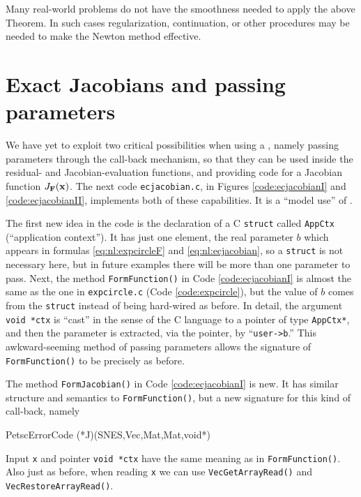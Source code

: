 Many real-world problems do not have the smoothness needed to apply the above Theorem.  In such cases regularization, continuation, or other procedures may be needed to make the Newton method effective.


\section{Exact Jacobians and passing parameters}

We have yet to exploit two critical possibilities when using a \pSNES, namely passing parameters through the call-back mechanism, so that they can be used inside the residual- and Jacobian-evaluation functions, and providing code for a Jacobian function $J_{\mathbf{F}}(\mathbf{x})$.  The next code \texttt{ecjacobian.c}, in Figures \ref{code:ecjacobianI} and \ref{code:ecjacobianII}, implements both of these capabilities.  It is a ``model use'' of \pSNES.

The first new idea in the code is the declaration of a C \texttt{struct} called \texttt{AppCtx} (``application context'').  It has just one element, the real parameter $b$ which appears in formulas \eqref{eq:nl:expcircleF} and \eqref{eq:nl:ecjacobian}, so a \texttt{struct} is not necessary here, but in future examples there will be more than one parameter to pass.  Next, the method \texttt{FormFunction()} in Code \ref{code:ecjacobianI} is almost the same as the one in \texttt{expcircle.c} (Code \ref{code:expcircle}), but the value of $b$ comes from the \texttt{struct} instead of being hard-wired as before.  In detail, the argument \texttt{void *ctx} is ``cast'' in the sense of the C language \citep{KernighanRitchie1988} to a pointer of type \texttt{AppCtx*}, and then the parameter is extracted, via the pointer, by ``\texttt{user->b}.''  This awkward-seeming method of passing parameters allows the signature of \texttt{FormFunction()} to be precisely as before.


The method \texttt{FormJacobian()} in Code \ref{code:ecjacobianI} is new.  It has similar structure and semantics to \texttt{FormFunction()}, but a new signature for this kind of call-back, namely
\begin{code}
PetscErrorCode (*J)(SNES,Vec,Mat,Mat,void*)
\end{code}
Input \pVec \texttt{x} and pointer \texttt{void *ctx} have the same meaning as in \texttt{FormFunction()}.  Also just as before, when reading \texttt{x} we can use \texttt{VecGetArrayRead()} and \texttt{VecRestoreArrayRead()}.

